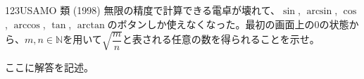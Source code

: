 \begin{prob}{123}{}{USAMO 類 (1998)}
 無限の精度で計算できる電卓が壊れて、$\sin$, $\arcsin$, $\cos$, $\arccos$, $\tan$, $\arctan$のボタンしか使えなくなった。最初の画面上の0の状態から、$m, n\in\mathbb{N}$を用いて$\sqrt{\dfrac{m}{n}}$と表される任意の数を得られることを示せ。
\end{prob}
ここに解答を記述。